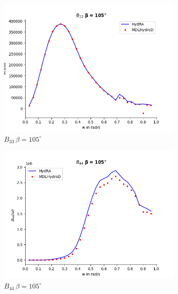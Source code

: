 \begin{figure}[H]
\begin{subfigure}[b]{0.45\textwidth}
    \end{subfigure}
    \vspace{5pt}%
    \begin{subfigure}[b]{0.45\textwidth}
        \includegraphics[width=\textwidth]{plots/kvlcc/radiation_damp/b33.png}
        \caption{$B_{33}\, \beta = 105^{\circ}$}
    \end{subfigure}
    \begin{subfigure}[b]{0.45\textwidth}
        \includegraphics[width=\textwidth]{plots/kvlcc/radiation_damp/b44.png}
        \caption{$B_{44} \, \beta = 105^{\circ}$}
    \end{subfigure}
    \vspace{5pt}%
    \begin{subfigure}[b]{0.45\textwidth}

\end{subfigure}
\end{figure}
